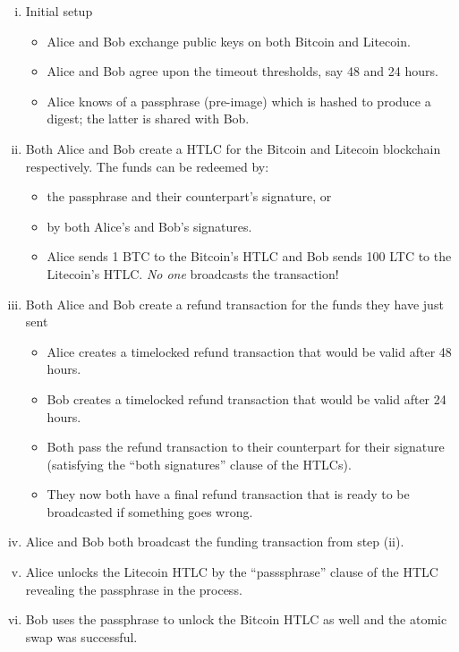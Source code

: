 \begin{enumerate}[(i)]
\item Initial setup
  \begin{itemize}
  \item Alice and Bob exchange public keys on both Bitcoin and Litecoin.
  \item Alice and Bob agree upon the timeout thresholds, say 48 and 24 hours.
  \item Alice knows of a passphrase (pre-image) which is hashed to produce a digest; the latter is shared with Bob.
  \end{itemize}

\item Both Alice and Bob create a HTLC for the Bitcoin and Litecoin blockchain respectively. The funds can be redeemed by:
  \begin{itemize}
  \item the passphrase and their counterpart's signature, or
  \item by both Alice's and Bob's signatures.
  \item Alice sends 1 BTC to the Bitcoin's HTLC and Bob sends 100 LTC to the Litecoin's HTLC. \emph{No one} broadcasts the transaction!
  \end{itemize}

\item Both Alice and Bob create a refund transaction for the funds they have just sent
  \begin{itemize}
  \item Alice creates a timelocked refund transaction that would be valid after 48 hours.
  \item Bob creates a timelocked refund transaction that would be valid after 24 hours.
  \item Both pass the refund transaction to their counterpart for their signature (satisfying the ``both signatures'' clause of the HTLCs).
  \item They now both have a final refund transaction that is ready to be broadcasted if something goes wrong.
  \end{itemize}

\item Alice and Bob both broadcast the funding transaction from step (ii).

\item Alice unlocks the Litecoin HTLC by the ``passsphrase'' clause of the HTLC revealing the passphrase in the process.

\item Bob uses the passphrase to unlock the Bitcoin HTLC as well and the atomic swap was successful.

\end{enumerate}

